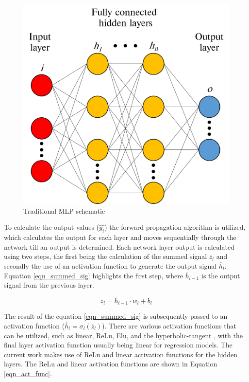 \documentclass[a4paper,fleqn]{cas-sc}
\begin{document}
\begin{figure}[h!]
	\centering
		\includegraphics[scale=0.5]{ML_SCHEMATIC}
	  \caption{Traditional MLP schematic}\label{fig_mlp_schematic}
\end{figure}

To calculate the output values ($\hat{y_i}$) the forward propagation algorithm is utilized, which calculates the output for each layer and moves sequentially through the network till an output is determined. Each network layer output is calculated using two steps, the first being the calculation of the summed signal $\overline{z}_l$ and secondly the use of an activation function to generate the output signal $\overline{h}_l$. Equation \ref{eqn_summed_sig} highlights the first step, where $\overline{h}_{l-1}$ is the output signal from the previous layer.

\begin{equation}\label{eqn_summed_sig}
\overline{z}_l = \overline{h}_{l-1}\cdot\overline{w}_l+\overline{b}_l
\end{equation}

The result of the equation \ref{eqn_summed_sig} is subsequently passed to an activation function ($\overline{h}_l = \sigma_l(\overline{z}_l)$). There are various activation functions that can be utilized, such as linear, ReLu, Elu, and the hyperbolic-tangent \citep{goodfellow}, with the final layer activation function usually being linear for regression models. The current work makes use of ReLu and linear activation functions for the hidden layers. The ReLu and linear activation functions are shown in Equation \ref{eqn_act_func}.
\end{document}
